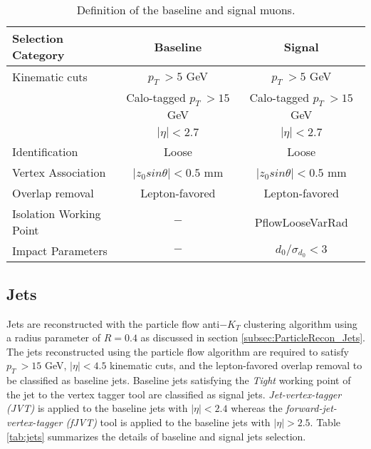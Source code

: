 \begin{table}[ht]
	\centering
		\caption{Definition of the baseline and signal muons.\label{tab:muon_baseline_signal}}
		\begin{tabular}{|| l || c | c ||}
		\hline
		Selection Category & \textbf{Baseline} & \textbf{Signal} \\
		\hline\hline
		Kinematic cuts & $p_{T}~ > 5$ GeV & $p_{T}~ > 5$ GeV \\
					& Calo-tagged $ p_{T}~ > 15$ GeV & Calo-tagged $ p_{T}~ > 15$ GeV \\
		      & $|\eta| < 2.7$ & $|\eta| < 2.7$\\
		\hline
		Identification & Loose & Loose \\
		\hline 
		Vertex Association & $|z_{0}sin\theta| < 0.5$ mm & $|z_{0}sin\theta|< 0.5$ mm\\
		\hline
		Overlap removal & Lepton-favored & Lepton-favored\\
		\hline
		Isolation Working Point & $-$ & PflowLooseVarRad\\
		\hline 
		Impact Parameters & $-$ & $d_{0}/\sigma_{d_{0}} < 3$ \\
		\hline
	\end{tabular}
\end{table}

\subsection{Jets}
\label{subsec:JetRecon}
Jets are reconstructed with the particle flow anti$-K_{T}$ clustering algorithm using a radius parameter of $R = 0.4$ as discussed in section \ref{subsec:ParticleRecon_Jets}. The jets reconstructed using the particle flow algorithm are required to satisfy $p_{T}~ > 15$ GeV, $ |\eta| < 4.5 $ kinematic cuts, and the lepton-favored overlap removal to be classified as baseline jets. Baseline jets satisfying the \textit{Tight} working point of the jet to the vertex tagger tool are classified as signal jets. \textit{Jet-vertex-tagger (JVT)} is applied to the baseline jets with $ |\eta| < 2.4 $ whereas the \textit{forward-jet-vertex-tagger (fJVT)} tool is applied to the baseline jets with $ |\eta| > 2.5 $. Table \ref{tab:jets} summarizes the details of baseline and signal jets selection. 

